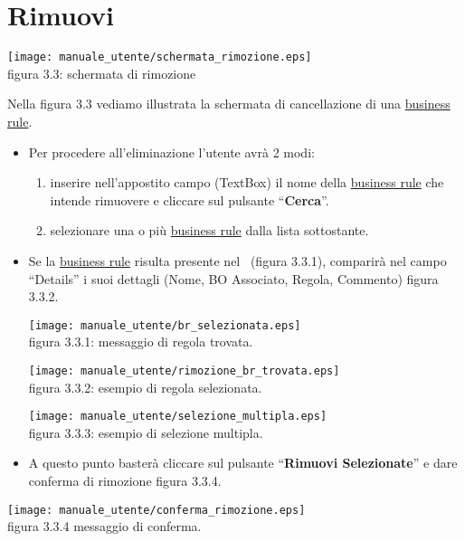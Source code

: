\section{Rimuovi \br}
\begin{center}
\texttt{[image: manuale\_utente/schermata\_rimozione.eps]}\\
 figura 3.3: schermata di rimozione
\end{center}
Nella figura 3.3 vediamo illustrata la schermata di cancellazione di una \underline{business rule}.
\begin{itemize}
\item Per procedere all'eliminazione l'utente avr\`a 2 modi:
\begin{enumerate}
\item inserire nell'appostito campo (TextBox) il nome della \underline{business rule} che intende rimuovere e cliccare sul pulsante ``\textbf{Cerca}''.
\item selezionare una o pi\`u \underline{business rule} dalla lista sottostante.
\end{enumerate}

\item Se la \underline{business rule} risulta presente nel \rp\ (figura 3.3.1), comparir\`a  nel campo ``Details'' i suoi dettagli (Nome, BO Associato, Regola, Commento) figura 3.3.2. 
\begin{center}
\texttt{[image: manuale\_utente/br\_selezionata.eps]}\\
 figura 3.3.1: messaggio di regola trovata.
\end{center} 

\begin{center}
\texttt{[image: manuale\_utente/rimozione\_br\_trovata.eps]}\\
 figura 3.3.2: esempio di regola selezionata.
\end{center} 

\begin{center}
\texttt{[image: manuale\_utente/selezione\_multipla.eps]}\\
 figura 3.3.3: esempio di selezione multipla.
\end{center} 

\item A questo punto baster\`a cliccare sul pulsante ``\textbf{Rimuovi Selezionate}'' e dare conferma di rimozione figura 3.3.4.  
\end{itemize}

\begin{center}
\texttt{[image: manuale\_utente/conferma\_rimozione.eps]}\\
 figura 3.3.4 messaggio di conferma.
\end{center} 

